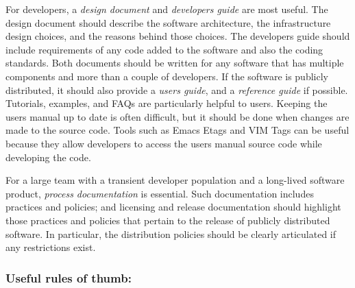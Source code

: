 \documentclass[]{article}
\begin{document}
For developers, a \emph{design document} and \emph{developers guide} are
most useful. The design document should describe the software
architecture, the infrastructure design choices, and the reasons behind
those choices. The developers guide should include requirements of any
code added to the software and also the coding standards. Both documents
should be written for any software that has multiple components and more
than a couple of developers. If the software is publicly distributed, it
should also provide a \emph{users guide}, and a \emph{reference guide}
if possible. Tutorials, examples, and FAQs are particularly helpful to
users. Keeping the users manual up to date is often difficult, but it
should be done when changes are made to the source code. Tools such as
Emacs Etags and VIM Tags can be useful because they allow developers to
access the users manual source code while developing the code.

For a large team with a transient developer population and a long-lived
software product, \emph{process documentation} is essential. Such
documentation includes practices and policies; and licensing and release
documentation should highlight those practices and policies that pertain
to the release of publicly distributed software. In particular, the
distribution policies should be clearly articulated if any restrictions
exist.

\subsubsection{\texorpdfstring{\textbf{Useful rules of
thumb:}}{Useful rules of thumb:}}\label{useful-rules-of-thumb}
\end{document}
